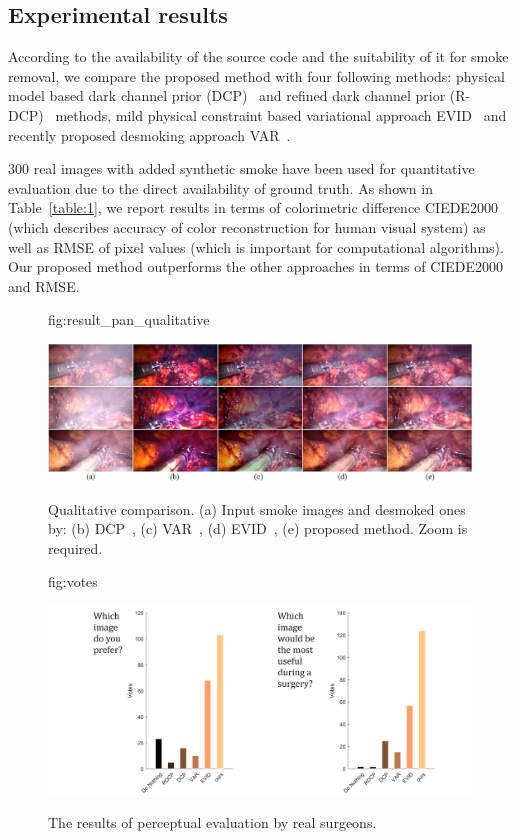 \documentclass[pmlr]{jmlr}
\begin{document}
\subsection{Experimental results}
According to the availability of the source code and the suitability of it for smoke removal, we compare the proposed method with four following  methods: physical model based dark channel prior (DCP)~\citep{he2011single} and refined dark channel prior (R-DCP)~\citep{tchakaa2017chromaticity} methods, mild physical constraint based variational approach EVID~\citep{galdran2015enhanced} and recently proposed desmoking approach VAR~\citep{wang2018variational}. 

300 real images with added synthetic smoke have been used for quantitative evaluation due to the direct availability of ground truth. As shown in Table~\ref{table:1}, we report results in terms of colorimetric difference CIEDE2000~\citep{doi:10.1002/col.1049} (which describes accuracy of color reconstruction for human visual system) as well as RMSE of pixel values (which is important for computational algorithms). Our proposed method outperforms the other approaches in terms of CIEDE2000 and RMSE.

\begin{figure}[t!]
\floatconts
{fig:result_pan_qualitative}
{\caption{Qualitative comparison. (a) Input smoke images and desmoked ones by: (b) DCP~\citep{he2011single}, (c)  VAR~\citep{wang2018variational}, (d) EVID~\citep{galdran2015enhanced}, (e) proposed method. Zoom is required.}}
{\includegraphics[width=1\linewidth]{fig3}}
\end{figure}

\begin{figure}[hb!]
\floatconts
{fig:votes}
{\caption{The results of perceptual evaluation by real surgeons.}}
{\includegraphics[width=1.05\linewidth]{fig4}}
\end{figure}
\end{document}
